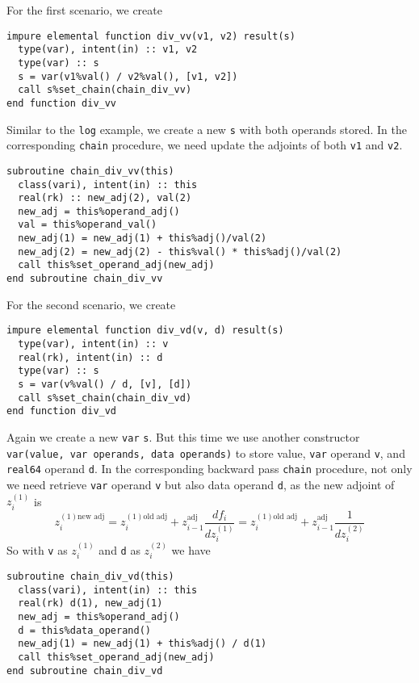 \documentclass[12pt, reqno, oneside]{amsbook}
\begin{document}
For the first scenario, we create
\begin{verbatim}
impure elemental function div_vv(v1, v2) result(s)
  type(var), intent(in) :: v1, v2
  type(var) :: s
  s = var(v1%val() / v2%val(), [v1, v2])
  call s%set_chain(chain_div_vv)
end function div_vv
\end{verbatim}
Similar to the \texttt{log} example, we create a new \texttt{s} with both operands
stored. In the corresponding \texttt{chain} procedure, we need update
the adjoints of both \texttt{v1} and \texttt{v2}.
\begin{verbatim}
subroutine chain_div_vv(this)
  class(vari), intent(in) :: this
  real(rk) :: new_adj(2), val(2)
  new_adj = this%operand_adj()
  val = this%operand_val()
  new_adj(1) = new_adj(1) + this%adj()/val(2)
  new_adj(2) = new_adj(2) - this%val() * this%adj()/val(2)
  call this%set_operand_adj(new_adj)
end subroutine chain_div_vv
\end{verbatim}

For the second scenario, we create
\begin{verbatim}
impure elemental function div_vd(v, d) result(s)
  type(var), intent(in) :: v
  real(rk), intent(in) :: d
  type(var) :: s
  s = var(v%val() / d, [v], [d])
  call s%set_chain(chain_div_vd)
end function div_vd
\end{verbatim}
Again we create a new \texttt{var} \texttt{s}. But this time
we use another constructor \texttt{var(value, var operands, data
operands)} to store value, \texttt{var} operand \texttt{v}, and \texttt{real64}
operand \texttt{d}. In the corresponding backward pass \texttt{chain} procedure, not
      only we need retrieve \texttt{var} operand \texttt{v} but also data operand
      \texttt{d}, as the new adjoint of \(z_i^{(1)}\) is
\begin{equation*}
z_i^{(1)\text{new adj}} = z_i^{(1)\text{old adj}} + z_{i-1}^{\text{adj}}\frac{df_i}{dz_i^{(1)}}
= z_i^{(1)\text{old adj}} + z_{i-1}^{\text{adj}}\frac{1}{dz_i^{(2)}}
\end{equation*}      
So with \texttt{v} as \(z_i^{(1)}\) and \texttt{d} as \(z_i^{(2)}\) we have
\begin{verbatim}
subroutine chain_div_vd(this)
  class(vari), intent(in) :: this
  real(rk) d(1), new_adj(1)
  new_adj = this%operand_adj()
  d = this%data_operand()
  new_adj(1) = new_adj(1) + this%adj() / d(1)
  call this%set_operand_adj(new_adj)
end subroutine chain_div_vd
\end{verbatim}
\end{document}
